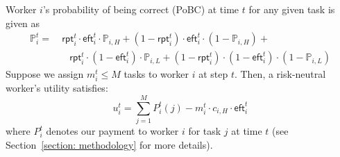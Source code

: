 \documentclass{article}
\begin{document}
Worker $i$'s probability of being correct (PoBC) at time $t$ for any given task is given as
\begin{equation}
\label{PPP}
\begin{split}
\mathbb{P}^{t}_i  =& ~\textsf{rpt}^{t}_i \cdot\textsf{eft}^{t}_i \cdot \mathbb{P}_{i,H}+ (1-\textsf{rpt}^{t}_i)\cdot \textsf{eft}^{t}_i \cdot (1-\mathbb{P}_{i,H})+\\
&\quad\textsf{rpt}^{t}_i \cdot(1-\textsf{eft}^{t}_i) \cdot \mathbb{P}_{i,L}+(1-\textsf{rpt}^{t}_i) \cdot(1-\textsf{eft}^{t}_i)\cdot (1-\mathbb{P}_{i,L})
\end{split}
\end{equation}
Suppose we assign $m^{t}_i\leq M$ tasks to worker $i$ at step $t$. Then, a risk-neutral worker's utility satisfies:
\begin{equation}
\label{equation:u_of_worker}
u_i^t={\sum}_{j=1}^{M}P_i^t(j) - m^{t}_i \cdot c_{i,H}\cdot \textsf{eft}^{t}_i
\end{equation}
where $P^{t}_{i}$ denotes our payment to worker $i$ for task $j$ at time $t$ (see Section~\ref{section: methodology} for more details).

 
\end{document}
